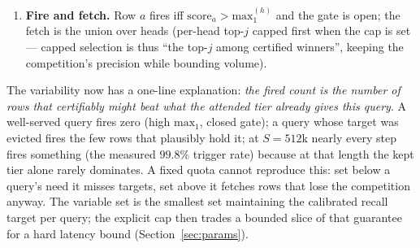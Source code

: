 \documentclass[11pt]{article}
\begin{document}
\begin{enumerate}[itemsep=1pt]
For a hard calibration query $q$ the archived target wins exactly when
$\mathrm{idx}_t + z\,\mathrm{cert}_t > \mathrm{max}_1$, i.e.\ when
$z > z_q := (\mathrm{max}_1 - \mathrm{idx}_t)/\mathrm{cert}_t$. Over $n$
exchangeable hard samples, take the order statistics
$z_{(1)} \le \cdots \le z_{(n)}$ and set
\[ z \;=\; z_{(k)}, \qquad k \;=\; \lceil (n{+}1)\,\tau_s \rceil . \]
This is the conformal quantile: by exchangeability alone --- no distributional
assumption on queries or rows --- a fresh hard query's required inflation
falls at or below $z_{(k)}$ with probability at least $\tau_s$, so
$P(\text{target recovered}) \ge \tau_s$ marginally. The quantile exists iff
$n \ge \tau_s/(1-\tau_s)$ (18 samples at $\tau=0.9$), which \emph{derives}
the calibration sample size: collect decode queries, doubling the window,
until that many hard samples exist (or a bounded cap is hit, in which case
$z$ clamps to a safety maximum $z_{\max}$ and errs toward over-fetching,
never under-recall). An earlier implementation searched an 11-rung ladder
for the smallest passing $z$; the ladder was a discretization of this same
quantile that could also undershoot its own target between rungs, and is
gone --- along with the ladder itself, its fallback rung, the fixed
calibration count, and the separate minimum-hard-sample knob, all of which
this one formula replaces.
\item \textbf{Fire and fetch.} Row $a$ fires iff
$\mathrm{score}_a > \mathrm{max}_1^{(h)}$ and the gate is open; the fetch
is the union over heads (per-head top-$j$ capped first when the cap is
set --- capped selection is thus ``the top-$j$ among certified winners'',
keeping the competition's precision while bounding volume).
\end{enumerate}

The variability now has a one-line explanation: \emph{the fired count is
the number of rows that certifiably might beat what the attended tier
already gives this query}. A well-served query fires zero (high
$\mathrm{max}_1$, closed gate); a query whose target was evicted fires the
few rows that plausibly hold it; at $S{=}512$k nearly every step fires
something (the measured $99.8\%$ trigger rate) because at that length the
kept tier alone rarely dominates. A fixed quota cannot reproduce this: set
below a query's need it misses targets, set above it fetches rows that
lose the competition anyway. The variable set is the smallest set
maintaining the calibrated recall target per query; the explicit cap then
trades a bounded slice of that guarantee for a hard latency bound
(Section~\ref{sec:params}).
\end{document}
